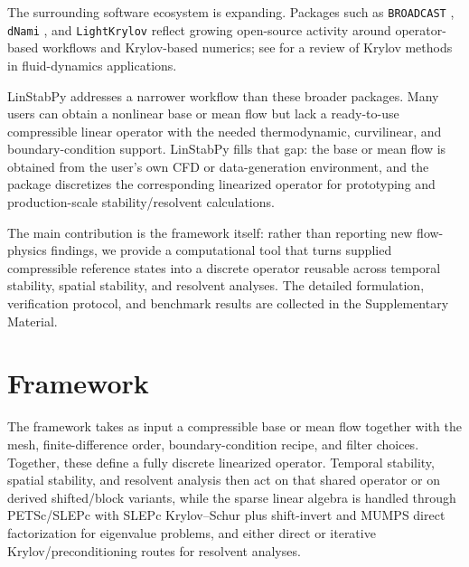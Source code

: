 \documentclass[10pt]{article}
\begin{document}
The surrounding software ecosystem is expanding. Packages such as
\texttt{BROADCAST} \citep{poulain2023broadcast},
\texttt{dNami} \citep{dnami2022}, and
\texttt{LightKrylov} \citep{kern2026lightkrylov} reflect growing open-source
activity around operator-based workflows and Krylov-based numerics; see
\citet{frantz2023krylov} for a review of Krylov methods in fluid-dynamics
applications.

LinStabPy addresses a narrower workflow than these broader packages.
Many users can obtain a nonlinear base or mean flow but lack a ready-to-use
compressible linear operator with the needed thermodynamic, curvilinear, and
boundary-condition support. LinStabPy fills that gap: the base or mean flow
is obtained from the user's own CFD or data-generation environment, and the
package discretizes the corresponding linearized operator for prototyping and
production-scale stability/resolvent calculations.

The main contribution is the framework itself: rather than reporting
new flow-physics findings, we provide a computational tool that turns
supplied compressible reference states into a discrete operator reusable
across temporal stability, spatial stability, and resolvent analyses.
The detailed formulation, verification protocol,
and benchmark results are collected in the Supplementary Material.

\section{Framework}

The framework takes as input a compressible base or mean flow together
with the mesh, finite-difference order, boundary-condition recipe, and filter
choices. Together, these define a fully discrete linearized operator.
Temporal stability, spatial stability, and resolvent analysis then act on that
shared operator or on derived shifted/block variants, while the sparse linear
algebra is handled through PETSc/SLEPc \citep{balay2025petsc,hernandez2005slepc}
with SLEPc Krylov--Schur plus shift-invert and MUMPS direct factorization
\citep{amestoy2001mumps} for eigenvalue problems, and either direct or
iterative Krylov/preconditioning routes
\citep{saad2003iterative,benzi2002preconditioning} for resolvent analyses.
\end{document}
